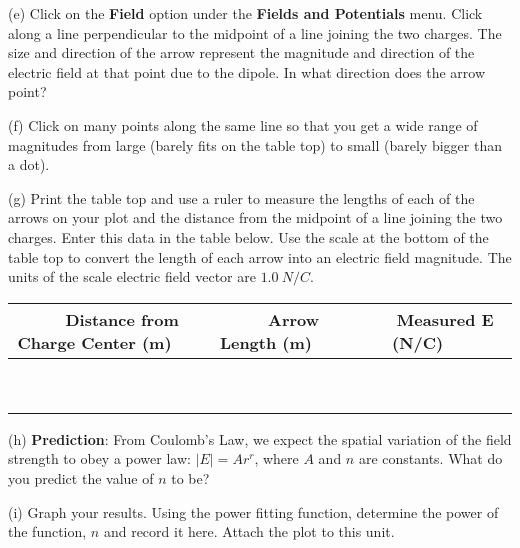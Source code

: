(e) Click on the \textbf{Field} option under the \textbf{Fields and Potentials} menu.
Click along a line perpendicular to the midpoint of a line joining the two charges.
The size and direction of the arrow represent the magnitude and direction of
the electric field at that point due to the dipole.
In what direction does the arrow point?
\vspace{15mm}

(f) Click on many points along the same line so that you get a wide range of magnitudes from large
(barely fits on the table top) to small (barely bigger than a dot).

(g) Print the table top and use a ruler to measure the lengths of each of the arrows
on your plot and the distance from the midpoint of a line joining the two charges. 
Enter this data in the table below.
Use the scale at the bottom of the table top to convert the length of each arrow into 
an electric field magnitude.
The units of the scale electric field vector are $1.0 ~ N/C$.

\vspace{0.3cm}
{\centering \begin{tabular}{|c|c|c|}
\hline 
~~~Distance from Charge Center (m)~~~&
~~~Arrow Length (m)~~~&
~~~Measured E (N/C)~~~\\
\hline
\hline 
&
&
\\
\hline 
&
&
\\
\hline 
&
&
\\
\hline 
&
&
\\
\hline 
&
&
\\
\hline 
&
&
\\
\hline 
&
&
\\
\hline 
&
&
\\
\hline 
&
&
\\
\hline
\end{tabular}\par}
\vspace{0.3cm}


(h) \textbf{Prediction}: From Coulomb's Law, we expect the spatial variation
of the field strength to obey a power law: \( \left| E\right| =Ar^{r} \),
where \( A \) and \( n \) are constants. What do you predict the
value of \( n \) to be?\vspace{15mm}

(i) Graph your results. Using the power fitting
function, determine the power of the function, $n$ and record it here.
Attach the plot to this unit.
\vspace{15mm}

